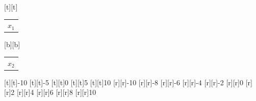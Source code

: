 %    
%
%
\begin{psfrags}%
\psfragscanon%
%
[t][t]{\color[rgb]{0,0,0}\setlength{\tabcolsep}{0pt}\begin{tabular}{c}$x_1$\end{tabular}}%
[b][b]{\color[rgb]{0,0,0}\setlength{\tabcolsep}{0pt}\begin{tabular}{c}$x_2$\end{tabular}}%
%
[t][t]{-10}%
[t][t]{-5}%
[t][t]{0}%
[t][t]{5}%
[t][t]{10}%
%
[r][r]{-10}%
[r][r]{-8}%
[r][r]{-6}%
[r][r]{-4}%
[r][r]{-2}%
[r][r]{0}%
[r][r]{2}%
[r][r]{4}%
[r][r]{6}%
[r][r]{8}%
[r][r]{10}%
%
%
\end{psfrags}%
%
